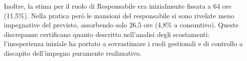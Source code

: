 \documentclass[11pt,a4paper]{article}
\begin{document}
Inoltre, la stima per il ruolo di Responsabile era inizialmente fissata a 64 ore (11,5\%). Nella pratica però le mansioni del responsabile si sono rivelate meno impegnative del previsto, assorbendo solo 26,5 ore (4,8\% a consuntivo). Queste discrepanze certificano quanto descritto nell'analisi degli scostamenti: l'inesperienza iniziale ha portato a sovrastimare i ruoli gestionali e di controllo a discapito dell'impegno puramente realizzativo.
\end{document}
